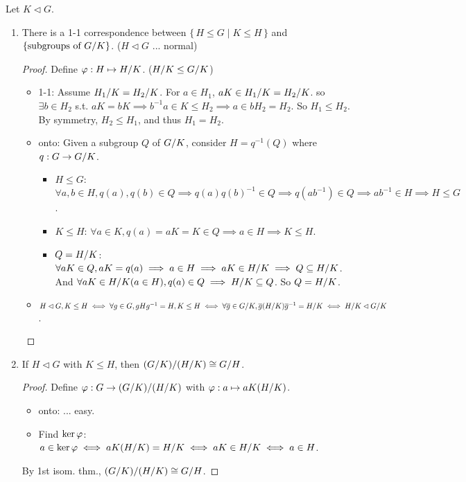 \begin{theorem}
  Let $K \lhd G$.
  \begin{enumerate}
    \item There is a 1-1 correspondence between $\{\, H \le G \mid K \le H \,\}$
      and $\{ \text{subgroups of ${G}/{K}$} \}$. ($H \lhd G$ ... normal)
      \begin{proof}
        Define $\varphi: H \mapsto {H}/{K}$. (${H}/{K} \le {G}/{K}$)
        \begin{itemize}
          \item 1-1: Assume ${H_1}/{K} = {H_2}/{K}$.
            For $a \in H_1$, $aK \in {H_1}/{K} = {H_2}/{K}$.
            so $\exists b \in H_2$ s.t. $aK = bK \implies b^{-1}a \in K \le H_2
            \implies a \in b H_2 = H_2$. So $H_1 \le H_2$. By symmetry,
            $H_2 \le H_1$, and thus $H_1 = H_2$.
          \item onto: Given a subgroup $Q$ of ${G}/{K}$, consider
            $H = q^{-1}(Q)$ where $q: G\to {G}/{K}$.
            \begin{itemize}
              \item $H \le G$: $\forall a, b \in H, q(a), q(b) \in Q \implies
                q(a)q(b)^{-1} \in Q \implies q(ab^{-1}) \in Q \implies
                ab^{-1} \in H \implies H \le G$.
              \item $K \le H$: $\forall a \in K, q(a) = aK = K \in Q \implies
                a \in H \implies K \le H$.
              \item $Q = {H}/{K}$: $\forall aK \in Q, aK = q(a) \implies
                a \in H \implies aK \in {H}/{K} \implies
                Q \subseteq {H}/{K}$.
                And $\forall aK \in {H}/{K} (a \in H), q(a) \in Q \implies
                  {H}/{K} \subseteq Q$. So $Q = {H}/{K}$.
            \end{itemize}
          \item $H \lhd G, K \le H \iff \forall g\in G, gHg^{-1} = H, K \le H
            \iff \forall \overline{g} \in {G}/{K}, \overline{g}({H}/{K})\overline{g}^{-1}
            = {H}/{K} \iff {H}/{K} \lhd {G}/{K}$. \qedhere
        \end{itemize}
      \end{proof}
    \item If $H \lhd G$ with $K \le H$, then ${({G}/{K})}/{({H}/{K})}
      \cong {G}/{H}$.
      \begin{proof}
        Define $\varphi: G \to{({G}/{K})}/{({H}/{K})}$ with
        $\varphi: a \mapsto aK({H}/{K})$.
        \begin{itemize}
          \item onto: ... easy.
          \item Find $\operatorname{ker} \varphi$: $a \in \operatorname{ker} \varphi \iff aK({H}/{K})
            = {H}/{K} \iff aK \in {H}/{K} \iff a \in H$.
        \end{itemize}
        By 1st isom. thm., ${({G}/{K})}/{({H}/{K})} \cong
        {G}/{H}$.
      \end{proof}
  \end{enumerate}
\end{theorem}

